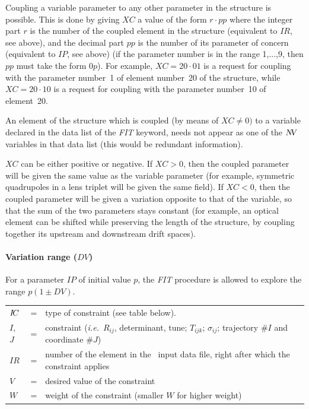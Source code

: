 \noindent  Coupling a variable parameter to any other parameter in the
structure is possible. This is done by giving $XC$ a value of the form $ r \cdot pp $ where
the integer part $ r $ is the number of the coupled element in the structure 
(equivalent to $ IR$, see above), and the decimal part $ pp $ is the number of its 
parameter of concern (equivalent to $ IP$,  see above) (if the parameter
number is in the range 1,...,9, then $ pp $ 
must take the form $ 0p $). For example, $ XC=20 \cdot 01 $ is a request for coupling with the
parameter number~1 of element number~20 of the structure, while $ XC=20 \cdot 10 $
is a request for coupling with the parameter number~10 of element~20.  

\bigskip

\noindent An element of the structure which is coupled (by means of $ XC\not=0) $ to a 
variable declared in the data list of the \textsl{FIT} keyword, needs not appear 
as one of the $ \textsl{N\!V } $ variables in that data list (this would be redundant information).  

\smallskip

\noindent$ XC $ can be either positive or negative. If $ XC>0$,  then the
coupled parameter will be given the same value as the variable parameter  
(for example, symmetric 
quadrupoles in a lens triplet will be given the same field). If $ XC<0$, 
then the coupled parameter will be given a variation opposite to that of the
variable, so that the sum of the two parameters stays constant (for example, an optical 
element can be shifted while preserving the length of the structure, by coupling 
together its upstream and downstream drift spaces).  


\smallskip
 
\paragraph{Variation range  ($DV$)} 

\noindent For a parameter $ IP $ of initial value $ p $, the \textsl{FIT} procedure is
allowed to explore the range $ p(1\pm DV)$.   

\smallskip

\begin{center}
	\begin{tabular}{lcp{10cm}}
	$I\!C$        &  = &  type of  constraint (see table below).\\
	$I$, $J$    & =  &  constraint (\emph{i.e.}~$R_{ij}$, determinant, tune; 
	                    $T_{ijk}$; $\sigma_{ ij}$; trajectory $\#I$ and coordinate $\#J$)\\
	$IR$       &  =  &  number of the element in the \zgou\ input data file, right after which 
	                    the constraint applies   \\
	$V$        &  =  &  desired value of the constraint\\
	$W$        &  =  &  weight of the constraint (smaller $W$ for higher weight)
	\end{tabular}
\end{center}




